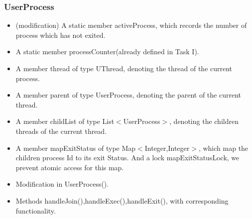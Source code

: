 \documentclass{article}
\begin{document}
	\subsubsection*{UserProcess}
	\begin{itemize}
		\item (modification) A static member activeProcess, which records the number of process which has not exited.
		\item A static member processCounter(already defined in Task I).
		\item A member thread of type UThread, denoting the thread of the current process.
		\item A member parent of type UserProcess, denoting the parent of the current thread.
		\item A member childList of type List$<$UserProcess$>$, denoting the children threads of the current thread.
		\item A member mapExitStatus of type Map$<$Integer,Integer$>$, which map the children process Id to its exit Status. And a lock mapExitStatusLock, we prevent atomic access for this map.
		
		\item Modification in UserProcess().
		
		\item Methods handleJoin(),handleExec(),handleExit(), with corresponding functionality.
	\end{itemize}
	
\end{document}

